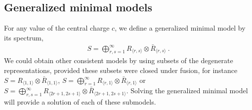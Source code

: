 \documentclass[12pt,a4paper,notitlepage]{report}
\numberwithin{equation}{section}
\theoremstyle{break}
\begin{document}
\subsection{Generalized minimal models}

For any value of the central charge $c$, we define a generalized minimal model by its spectrum,
\begin{align}
 \boxed{S = \bigoplus_{r,s=1}^\infty R_{\langle r,s \rangle}\otimes \bar{R}_{\langle r,s \rangle}}\ .
\end{align}
We could obtain other consistent models by using subsets of the degenerate representations, provided these subsets were closed under fusion, for instance $S=R_{\langle 1,1 \rangle}\otimes \bar{R}_{\langle 1,1 \rangle}$, $S=\bigoplus_{r=1}^\infty R_{\langle r,1 \rangle}\otimes \bar{R}_{\langle r,1 \rangle}$ or $S=\bigoplus_{r,s=1}^{\infty} R_{\langle 2r+1,2s+1 \rangle}\otimes \bar{R}_{\langle 2r+1,2s+1 \rangle}$.
Solving the generalized minimal model will provide a solution of each of these submodels. 
\end{document}
